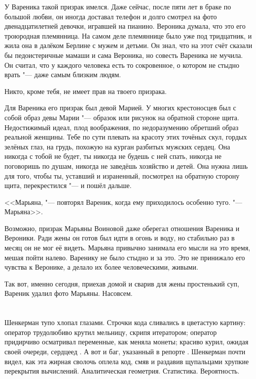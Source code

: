 У Вареника такой призрак имелся.
Даже сейчас, после пяти лет в браке по большой любви, он иногда доставал телефон и долго смотрел на фото двенадцатилетней девочки, игравшей на пианино.
Вероника думала, что это его троюродная племянница.
На самом деле племяннице было уже под тридцатник, и жила она в далёком Берлине с мужем и детьми.
Он знал, что на этот счёт сказали бы педоистеричные мамаши и сама Вероника, но совесть Вареника не мучила.
Он считал, что у каждого человека есть то сокровенное, о котором не стыдно врать "--- даже самым близким людям.

Никто, кроме тебя, не имеет прав на твоего призрака.

Для Вареника его призрак был девой Марией.
У многих крестоносцев был с собой образ девы Марии "--- образок или рисунок на обратной стороне щита.
Недостижимый идеал, плод воображения, по недоразумению обретший образ реальной женщины.
Тебе по сути плевать на красоту этих точёных скул, гордых зелёных глаз, на грудь, похожую на курган разбитых мужских сердец.
Она никогда с тобой не будет, ты никогда не будешь с ней спать, никогда не поговоришь по душам, никогда не заведёшь хозяйство и детей.
Она нужна лишь для того, чтобы ты, уставший и израненный, посмотрел на обратную сторону щита, перекрестился "--- и пошёл дальше.

<<Марьяна, "--- повторял Вареник, когда ему приходилось особенно туго.
"--- Марьяна>>.

Возможно, призрак Марьяны Воиновой даже оберегал отношения Вареника и Вероники.
Ради жены он готов был идти в огонь и воду, но стабильно раз в месяц он не мог её видеть.
Марьяна привычно занимала его мысли на это время, мешая пойти налево.
Варенику не было стыдно и за это.
Это не принижало его чувства к Веронике, а делало их более человеческими, живыми.

Так вот, именно сегодня, приехав домой и сварив для жены простенький суп, Вареник удалил фото Марьяны.
Насовсем.

\chapter{}

\textspace

\label{Sat_2012_07_07}

Шенкерман тупо хлопал глазами.
Строчки кода сливались в цветастую картину: оператор  трудолюбиво крутил мельницу, скрипя итератором;
оператор  придирчиво осматривал переменные, как меняла монеты;
красиво курил, ожидая своей очереди, сердцеед .
А вот и баг, указанный в репорте .
Шенкерман почти видел, как эта жирная сволочь оплела код, смяв и раздавив щупальцами хрупкие перекрытия вычислений.
Аналитическая геометрия.
Статистика.
Вероятность.

